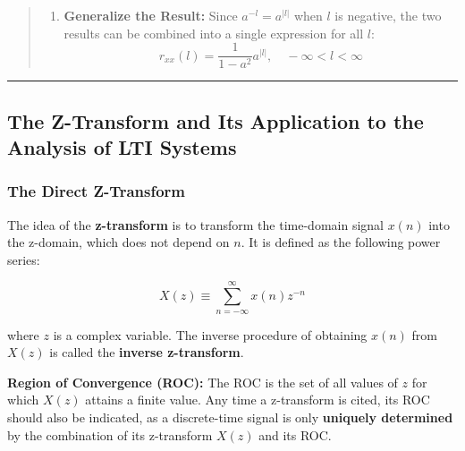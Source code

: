 \begin{quote}
\begin{enumerate}
  \begin{itemize}
  \tightlist
  \item
    Apply the formula:
    \[r_{xx}(l) = \sum_{n=0}^{\infty} x(n)x(n-l) = a^{-l} \sum_{n=0}^{\infty} (a^2)^n\]
  \item
    Apply the geometric series formula:
    \[r_{xx}(l) = \frac{1}{1-a^2} a^{-l}, \quad l < 0\]
  \end{itemize}
\item
  \textbf{Generalize the Result:} Since \(a^{-l} = a^{|l|}\) when \(l\)
  is negative, the two results can be combined into a single expression
  for all \(l\):
  \[r_{xx}(l) = \frac{1}{1-a^2} a^{|l|}, \quad -\infty < l < \infty\]
\end{enumerate}
\end{quote}

\begin{center}\rule{0.5\linewidth}{0.5pt}\end{center}

\subsection{The Z-Transform and Its Application to the Analysis of LTI
Systems}\label{the-z-transform-and-its-application-to-the-analysis-of-lti-systems}

\subsubsection{The Direct Z-Transform}\label{the-direct-z-transform}

The idea of the \textbf{z-transform} is to transform the time-domain
signal \(x(n)\) into the z-domain, which does not depend on \(n\). It is
defined as the following power series:

\[X(z) \equiv \sum_{n=-\infty}^{\infty} x(n)z^{-n}\]

where \(z\) is a complex variable. The inverse procedure of obtaining
\(x(n)\) from \(X(z)\) is called the \textbf{inverse z-transform}.

\textbf{Region of Convergence (ROC):} The ROC is the set of all values
of \(z\) for which \(X(z)\) attains a finite value. Any time a
z-transform is cited, its ROC should also be indicated, as a
discrete-time signal is only \textbf{uniquely determined} by the
combination of its z-transform \(X(z)\) and its ROC.

